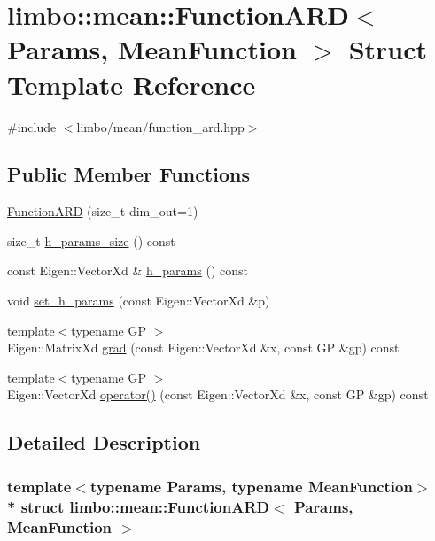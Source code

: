 \hypertarget{structlimbo_1_1mean_1_1_function_a_r_d}{}\section{limbo\+:\+:mean\+:\+:Function\+A\+RD$<$ Params, Mean\+Function $>$ Struct Template Reference}
\label{structlimbo_1_1mean_1_1_function_a_r_d}


{\ttfamily \#include $<$limbo/mean/function\+\_\+ard.\+hpp$>$}

\subsection*{Public Member Functions}
\begin{DoxyCompactItemize}
\item 
\hyperlink{structlimbo_1_1mean_1_1_function_a_r_d_ae43aef0e74455e5c97dd2d8cda17a0a1}{Function\+A\+RD} (size\+\_\+t dim\+\_\+out=1)
\item 
size\+\_\+t \hyperlink{structlimbo_1_1mean_1_1_function_a_r_d_aaf1b474fc0a0c7b9738da60bca99b45b}{h\+\_\+params\+\_\+size} () const 
\item 
const Eigen\+::\+Vector\+Xd \& \hyperlink{structlimbo_1_1mean_1_1_function_a_r_d_a4b8676c860264932e5ebd302e46e1a42}{h\+\_\+params} () const 
\item 
void \hyperlink{structlimbo_1_1mean_1_1_function_a_r_d_a02dabc2cbdf001450cdd893f578c042d}{set\+\_\+h\+\_\+params} (const Eigen\+::\+Vector\+Xd \&p)
\item 
{\footnotesize template$<$typename GP $>$ }\\Eigen\+::\+Matrix\+Xd \hyperlink{structlimbo_1_1mean_1_1_function_a_r_d_a5bd1343c7f3616c066296813361d9a96}{grad} (const Eigen\+::\+Vector\+Xd \&x, const GP \&gp) const 
\item 
{\footnotesize template$<$typename GP $>$ }\\Eigen\+::\+Vector\+Xd \hyperlink{structlimbo_1_1mean_1_1_function_a_r_d_acfc9ce5670a247a35a1f09e5f0a09adb}{operator()} (const Eigen\+::\+Vector\+Xd \&x, const GP \&gp) const 
\end{DoxyCompactItemize}


\subsection{Detailed Description}
\subsubsection*{template$<$typename Params, typename Mean\+Function$>$\\*
struct limbo\+::mean\+::\+Function\+A\+R\+D$<$ Params, Mean\+Function $>$}

